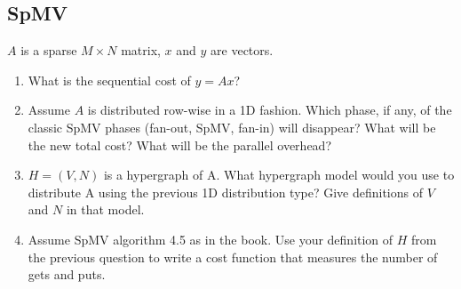 \documentclass[../main.tex]{subfiles}
\begin{document}
\subsection{SpMV}
\begin{question}
$A$ is a sparse $M \times N$ matrix, $x$ and $y$ are vectors.
\begin{enumerate}
	\item What is the sequential cost of $y=Ax$?
	\item Assume $A$ is distributed row-wise in a 1D fashion. Which phase, if any, of the classic SpMV phases (fan-out, SpMV, fan-in) will disappear? What will be the new total cost? What will be the parallel overhead?
	\item $H=(V,N)$ is a hypergraph of A. What hypergraph model would you use to distribute A using the previous 1D distribution type? Give definitions of $V$ and $N$ in that model.
	\item Assume SpMV algorithm 4.5 as in the book. Use your definition of $H$ from the previous question to write a cost function that measures the number of gets and puts.
\end{enumerate}
\end{question}
\end{document}
